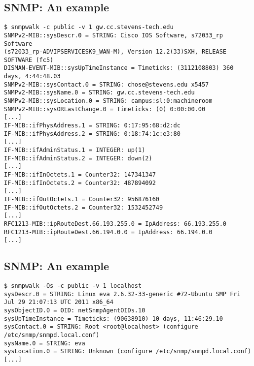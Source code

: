 \documentclass[xga]{xdvislides}
\begin{document}
\subsection{SNMP: An example}
\smallish
\begin{verbatim}
$ snmpwalk -c public -v 1 gw.cc.stevens-tech.edu
SNMPv2-MIB::sysDescr.0 = STRING: Cisco IOS Software, s72033_rp Software
(s72033_rp-ADVIPSERVICESK9_WAN-M), Version 12.2(33)SXH, RELEASE SOFTWARE (fc5)
DISMAN-EVENT-MIB::sysUpTimeInstance = Timeticks: (3112108803) 360 days, 4:44:48.03
SNMPv2-MIB::sysContact.0 = STRING: chose@stevens.edu x5457
SNMPv2-MIB::sysName.0 = STRING: gw.cc.stevens-tech.edu
SNMPv2-MIB::sysLocation.0 = STRING: campus:sl:0:machineroom
SNMPv2-MIB::sysORLastChange.0 = Timeticks: (0) 0:00:00.00
[...]
IF-MIB::ifPhysAddress.1 = STRING: 0:17:95:68:d2:dc
IF-MIB::ifPhysAddress.2 = STRING: 0:18:74:1c:e3:80
[...]
IF-MIB::ifAdminStatus.1 = INTEGER: up(1)
IF-MIB::ifAdminStatus.2 = INTEGER: down(2)
[...]
IF-MIB::ifInOctets.1 = Counter32: 147341347
IF-MIB::ifInOctets.2 = Counter32: 487894092
[...]
IF-MIB::ifOutOctets.1 = Counter32: 956876160
IF-MIB::ifOutOctets.2 = Counter32: 1532452749
[...]
RFC1213-MIB::ipRouteDest.66.193.255.0 = IpAddress: 66.193.255.0
RFC1213-MIB::ipRouteDest.66.194.0.0 = IpAddress: 66.194.0.0
[...]
\end{verbatim}
\Normalsize

\subsection{SNMP: An example}
\smallish
\begin{verbatim}
$ snmpwalk -Os -c public -v 1 localhost
sysDescr.0 = STRING: Linux eva 2.6.32-33-generic #72-Ubuntu SMP Fri Jul 29 21:07:13 UTC 2011 x86_64
sysObjectID.0 = OID: netSnmpAgentOIDs.10
sysUpTimeInstance = Timeticks: (90638910) 10 days, 11:46:29.10
sysContact.0 = STRING: Root <root@localhost> (configure /etc/snmp/snmpd.local.conf)
sysName.0 = STRING: eva
sysLocation.0 = STRING: Unknown (configure /etc/snmp/snmpd.local.conf)
[...]
\end{verbatim}
\end{document}
